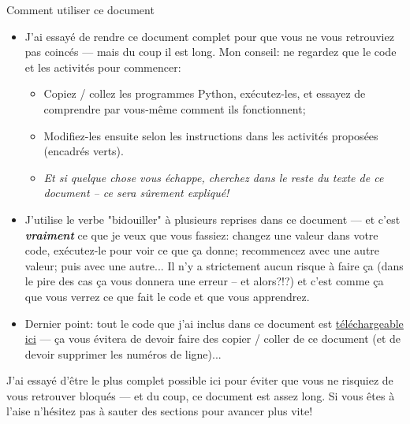 \documentclass[11pt]{article}
\begin{document}
	\begin{MonAmp}{Comment utiliser ce document}
		\begin{itemize}
			\item J'ai essayé de rendre ce document complet pour que vous ne vous retrouviez pas coincés --- mais du coup il est long. Mon conseil: ne regardez que le code et les activités pour commencer:
			\begin{itemize}
				\item Copiez / collez les programmes Python, exécutez-les, et essayez de comprendre par vous-même comment ils fonctionnent;
				\item Modifiez-les ensuite selon les instructions dans les activités proposées (encadrés verts).
				\item \textit{Et si quelque chose vous échappe, cherchez dans le reste du texte de ce document -- ce sera sûrement expliqué!}
			\end{itemize}
			\item J'utilise le verbe "bidouiller" à plusieurs reprises dans ce document --- et c'est \textbf{\textit{vraiment}} ce que je veux que vous fassiez: changez une valeur dans votre code, exécutez-le pour voir ce que ça donne; recommencez avec une autre valeur; puis avec une autre... Il n'y a strictement aucun risque à faire ça (dans le pire des cas ça vous donnera une erreur -- et alors?!?) et c'est comme ça que vous verrez ce que fait le code et que vous apprendrez.
			\item Dernier point: tout le code que j'ai inclus dans ce document est \href{https://www.dropbox.com/scl/fi/ssngjj5nxguwcrr563pge/_code.zip?rlkey=zgrmhxhbaz5wi50m6whphosb8&dl=0}{téléchargeable ici} --- ça vous évitera de devoir faire des copier / coller de ce document (et de devoir supprimer les numéros de ligne)...
		\end{itemize}
	\end{MonAmp}
	
	J'ai essayé d'être le plus complet possible ici pour éviter que vous ne risquiez de vous retrouver bloqués --- et du coup, ce document est assez long. Si vous êtes à l'aise n'hésitez pas à sauter des sections pour avancer plus vite!
	
\end{document}
